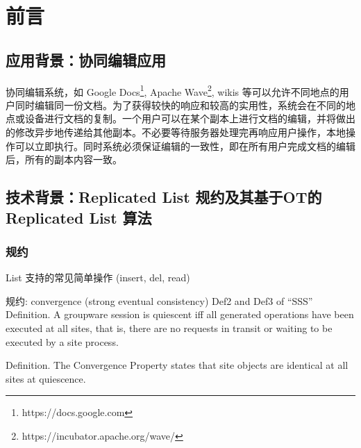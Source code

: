 \chapter{前言}
\section{应用背景：协同编辑应用}
	\par 协同编辑系统，如 Google Docs\footnote{https://docs.google.com}, Apache Wave\footnote{https://incubator.apache.org/wave/}, wikis \cite{citeulike:1087263} 等可以允许不同地点的用户同时编辑同一份文档。为了获得较快的响应和较高的实用性，系统会在不同的地点或设备进行文档的复制。一个用户可以在某个副本上进行文档的编辑，并将做出的修改异步地传递给其他副本。不必要等待服务器处理完再响应用户操作，本地操作可以立即执行。同时系统必须保证编辑的一致性，即在所有用户完成文档的编辑后，所有的副本内容一致。

\section{技术背景：Replicated List 规约及其基于OT的 Replicated List 算法}

\subsection{规约}
List 支持的常见简单操作 (insert, del, read)

规约: convergence (strong eventual consistency)
Def2 and Def3 of ``SSS''
Definition. A groupware session is quiescent iff all generated
operations have been executed at all sites, that is, there
are no requests in transit or waiting to be executed by a
site process.\cite{ellis1989concurrency}

Definition. The Convergence Property states that site objects
are identical at all sites at quiescence.\cite{ellis1989concurrency}

